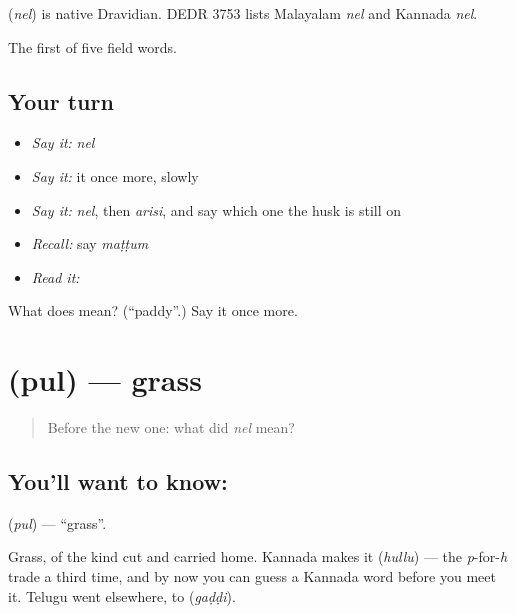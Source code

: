 \begin{cousinweb}
\textbf{} (\emph{nel}) is native Dravidian. DEDR 3753 lists Malayalam \emph{nel} and Kannada \emph{nel}.
\end{cousinweb}

\begin{grammarlens}[title={What you've built}]
The first of five field words.
\end{grammarlens}

\subsection*{Your turn}
\begin{itemize}
\raggedright
  \item \emph{Say it:} \emph{nel}
  \item \emph{Say it:} it once more, slowly
  \item \emph{Say it:} \emph{nel}, then \emph{arisi}, and say which one the husk is still on
  \item \emph{Recall:} say \emph{maṭṭum}
  \item \emph{Read it:} \textbf{}
\end{itemize}

\begin{tcolorbox}[breakable,colback=teal!4,colframe=teal!35!black,title={Before you move on}]
What does  mean? (\textquotedblleft{}paddy\textquotedblright{}.) Say it once more.
\end{tcolorbox}
\section[\texorpdfstring{\ta{புல்} (pul)}{புல் (pul)}]{ (pul) — grass}

\label{lesson:TA-C64-grass}



\begin{quote}
Before the new one: what did \emph{nel} mean?
\end{quote}

\subsection*{You'll want to know: }
\textbf{} (\emph{pul}) — \textquotedblleft{}grass\textquotedblright{}.

Grass, of the kind cut and carried home. Kannada makes it  (\emph{hullu}) — the \emph{p}-for-\emph{h} trade a third time, and by now you can guess a Kannada word before you meet it. Telugu went elsewhere, to  (\emph{gaḍḍi}).

